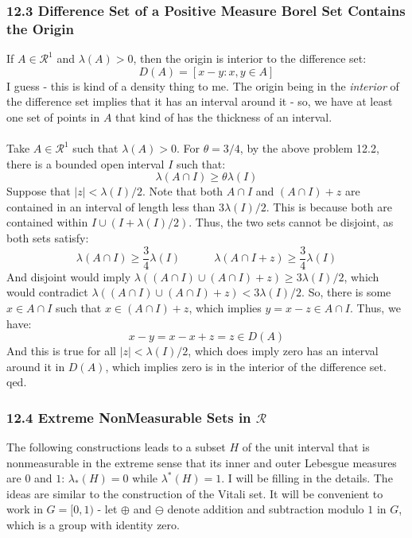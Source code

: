 \documentclass[12pt,a4paper]{article}
\newcommand{\1}[1]{\mathbbm{1}\left\{ #1 \right\}}
\newcommand{\rcal}{\mathcal{R}}
\begin{document}
\subsubsection{12.3 Difference Set of a Positive Measure Borel Set Contains the Origin} If $A \in \rcal^1$ and $\lambda(A) > 0$, then the origin is interior to the difference set:
$$
	D(A) = \left[x - y: x,y \in A\right]
$$
I guess - this is kind of a density thing to me. The origin being in the \textit{interior} of the difference set implies that it has an interval around it - so, we have at least one set of points in $A$ that kind of has the thickness of an interval.
\\\\
Take $A \in \rcal^1$ such that $\lambda(A) > 0$. For $\theta = 3/4$, by the above problem 12.2, there is a bounded open interval $I$ such that:
$$
	\lambda(A \cap I) \geq \theta\lambda(I)
$$
Suppose that $|z| < \lambda(I)/2$. Note that both $A \cap I$ and $(A \cap I) + z$ are contained in an interval of length less than $3\lambda(I)/2$. This is because both are contained within $I \cup (I + \lambda(I)/2)$. Thus, the two sets cannot be disjoint, as both sets satisfy:
$$
	\lambda(A \cap I) \geq \frac{3}{4}\lambda(I) \quad\quad\quad
	\lambda(A \cap I + z) \geq \frac{3}{4}\lambda(I)
$$ 
And disjoint would imply $\lambda((A \cap I) \cup (A \cap I) + z) \geq 3\lambda(I)/2$, which would contradict $\lambda((A \cap I) \cup (A \cap I) + z) < 3\lambda(I)/2$. So, there is some $x \in A \cap I$ such that $x \in (A \cap I) + z$, which implies $y = x - z \in A \cap I$. Thus, we have:
$$
	x - y = x - x + z = z \in D(A)
$$
And this is true for all $|z| < \lambda(I)/2$, which does imply zero has an interval around it in $D(A)$, which implies zero is in the interior of the difference set. qed.

\subsubsection{12.4 Extreme NonMeasurable Sets in $\rcal$} The following constructions leads to a subset $H$ of the unit interval that is nonmeasurable in the extreme sense that its inner and outer Lebesgue measures are $0$ and $1$: $\lambda_*(H) = 0$ while $\lambda^*(H) = 1$. I will be filling in the details. The ideas are similar to the construction of the Vitali set. It will be convenient to work in $G = [0,1)$ - let $\oplus$ and $\ominus$ denote addition and subtraction modulo $1$ in $G$, which is a group with identity zero.
\end{document}
